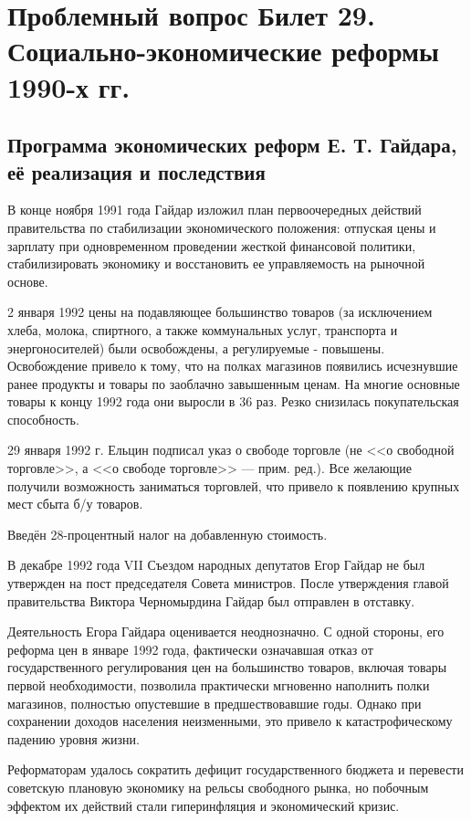 \section{\textbf{Проблемный вопрос} Билет 29. Социально-экономические реформы 1990-х гг.}
\subsection{Программа экономических реформ Е. Т. Гайдара, её реализация и последствия}
В конце ноября 1991 года Гайдар изложил план первоочередных действий правительства по стабилизации экономического положения: отпуская цены и зарплату при одновременном проведении жесткой финансовой политики, стабилизировать экономику и восстановить ее управляемость на рыночной основе.

2 января 1992 цены на подавляющее большинство товаров (за исключением хлеба, молока, спиртного, а также коммунальных услуг, транспорта и энергоносителей) были освобождены, а регулируемые - повышены. Освобождение привело к тому, что на полках магазинов появились исчезнувшие ранее продукты и товары по заоблачно завышенным ценам. На многие основные товары к концу 1992 года они выросли в 36 раз. Резко снизилась покупательская способность.

29 января 1992 г. Ельцин подписал указ о свободе торговле (не <<о свободной торговле>>, а <<о свободе торговле>> --- прим. ред.). Все желающие получили возможность заниматься торговлей, что привело к появлению крупных мест сбыта б/у товаров.

Введён 28-процентный налог на добавленную стоимость.

В декабре 1992 года VII Съездом народных депутатов Егор Гайдар не был утвержден на пост председателя Совета министров. После утверждения главой правительства Виктора Черномырдина Гайдар был отправлен в отставку.

Деятельность Егора Гайдара оценивается неоднозначно. С одной стороны, его реформа цен в январе 1992 года, фактически означавшая отказ от государственного регулирования цен на большинство товаров, включая товары первой необходимости, позволила практически мгновенно наполнить полки магазинов, полностью опустевшие в предшествовавшие годы. Однако при сохранении доходов населения неизменными, это привело к катастрофическому падению уровня жизни.

Реформаторам удалось сократить дефицит государственного бюджета и перевести советскую плановую экономику на рельсы свободного рынка, но побочным эффектом их действий стали гиперинфляция и экономический кризис.
